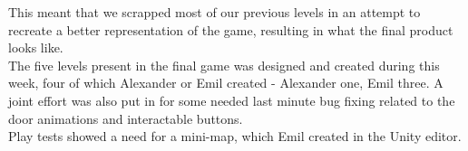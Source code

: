 This meant that we scrapped most of our previous levels in an attempt to recreate a better representation of the game, resulting in what the final product looks like.\\

The five levels present in the final game was designed and created during this week, four of which Alexander or Emil created - Alexander one, Emil three. A joint effort was also put in for some needed last minute bug fixing related to the door animations and interactable buttons.\\

Play tests showed a need for a mini-map, which Emil created in the Unity editor. 
